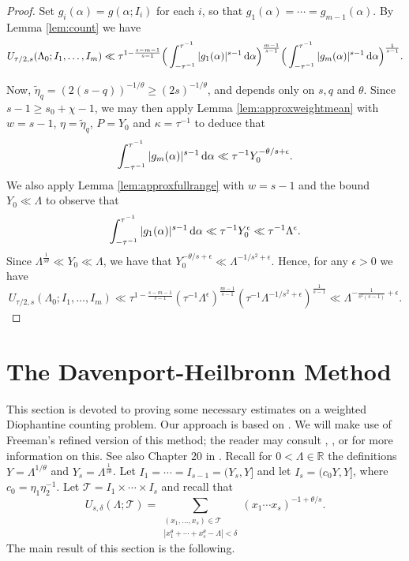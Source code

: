\documentclass[11pt,reqno]{amsart}
\numberwithin{equation}{section}
\renewcommand{\d}{\,{\rm d}}
\begin{document}
\begin{proof} Set $g_i(\alpha) = g(\alpha;I_i)$ for each $i$, so that $g_1(\alpha) = \cdots = g_{m-1}(\alpha)$. By Lemma \ref{lem:count} we have 
\[ U_{\tau/2,s}(\Lambda_0;I_1,\ldots,I_m) \ll \tau^{1-\frac{s-m-1}{s-1}}\Big( \int_{-\tau^{-1}}^{\tau^{-1}} |g_1(\alpha)|^{s-1}\d\alpha \Big)^{\frac{m-1}{s-1}}\Big( \int_{-\tau^{-1}}^{\tau^{-1}} |g_m(\alpha)|^{s-1}\d\alpha\Big)^{\frac{1}{s-1}}. \]

Now, $\tilde{\eta}_q = (2(s-q))^{-1/\theta} \geq (2s)^{-1/\theta}$, and depends only on $s, q$ and $\theta$. Since $s-1 \geq s_0+\chi-1$, we may then apply Lemma \ref{lem:approxweightmean} with $w = s-1$, $\eta = \tilde{\eta}_q$, $P = Y_0$ and $\kappa = \tau^{-1}$ to deduce that
\[  \int_{-\tau^{-1}}^{\tau^{-1}} |g_m(\alpha)|^{s-1}\d\alpha \ll \tau^{-1}Y_0^{-\theta/s+\epsilon}. \]
We also apply Lemma \ref{lem:approxfullrange} with $w = s-1$ and the bound $Y_0 \ll \Lambda$ to observe that 
\[ \int_{-\tau^{-1}}^{\tau^{-1}} |g_1(\alpha)|^{s-1}\d\alpha \ll \tau^{-1}Y_0^{\epsilon} \ll \tau^{-1}\Lambda^{\epsilon}. \]
Since $\Lambda^{\frac{1}{s\theta}} \ll Y_0 \ll \Lambda $, we have that $Y_0^{-\theta/s+\epsilon} \ll \Lambda^{-1/s^2+\epsilon}$. Hence, for any $\epsilon > 0$ we have 
\[ U_{\tau/2,s}(\Lambda_0; I_1,\ldots, I_m) \ll \tau^{1-\frac{s-m-1}{s-1}}(\tau^{-1}\Lambda^{\epsilon})^{\frac{m-1}{s-1}}(\tau^{-1}\Lambda^{-1/s^2+\epsilon})^{\frac{1}{s-1}} \ll \Lambda^{-\frac{1}{s^2(s-1)}+\epsilon}. \]
\end{proof}

















\section{The Davenport-Heilbronn Method} \label{sec:DH}
This section is devoted to proving some necessary estimates on a weighted Diophantine counting problem. Our approach is based on \cite{WoolThin}. We will make use of Freeman's refined version of this method; the reader may consult \cite{FreemanLB}, \cite{FreemanAsymp}, \cite{Poulias1} or \cite{WooleyDHF} for more information on this. See also Chapter 20 in \cite{DavBook}. Recall for $0 < \Lambda \in \mathbb{R}$ the definitions $Y = \Lambda^{1/\theta}$ and $Y_s = \Lambda^{\frac{1}{s\theta}}$. 
Let $I_1 = \cdots = I_{s-1} = (Y_s,Y]$ and let $I_s = (c_0Y, Y]$, where $c_0 = \eta_1\eta_2^{-1}$. Let $\mathcal{T} = I_1\times \cdots \times I_s$ and recall that 
\[ U_{s,\delta}(\Lambda; \mathcal{T}) = \sum_{\substack{ (x_1,\ldots,x_s) \in \mathcal{T} \\ |x_1^{\theta}+\cdots+x_s^{\theta}-\Lambda|<\delta }} (x_1\cdots x_s)^{-1+\theta/s}. \]
The main result of this section is the following. 
\end{document}
